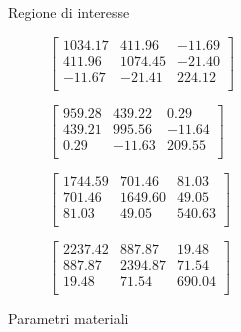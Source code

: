 \documentclass[aspectratio=169,xcolor=dvipsnames]{beamer}
\begin{document}
\begin{frame}{Regione di interesse}
\begin{figure}
\end{figure}
\begin{figure}
				\centering
		\begin{minipage}[b]{0.22\linewidth}
			\tiny{$
				\begin{bmatrix}
					1034.17 & 411.96 & -11.69 \\
					411.96 & 1074.45 & -21.40 \\
					-11.67 & -21.41 & 224.12 \\
				\end{bmatrix}
				$}
		\end{minipage}\hspace{0.01\linewidth}
		\begin{minipage}[b]{0.22\linewidth}
			\centering
			\tiny{$
				\begin{bmatrix}
					959.28 & 439.22 & 0.29 \\
					439.21 & 995.56 & -11.64 \\
					0.29 & -11.63 & 209.55 \\
				\end{bmatrix}
				$}
		\end{minipage}\hspace{0.01\linewidth}
		\begin{minipage}[b]{0.22\linewidth}
			\centering
			\tiny{$
				\begin{bmatrix}
					1744.59 & 701.46 & 81.03 \\
					701.46 & 1649.60 & 49.05 \\
					81.03 & 49.05 & 540.63 \\
				\end{bmatrix}
				$}
		\end{minipage}\hspace{0.01\linewidth}
		\begin{minipage}[b]{0.22\linewidth}
			\centering
			\tiny{$
				\begin{bmatrix}
					2237.42 & 887.87 & 19.48 \\
					887.87 & 2394.87 & 71.54 \\
					19.48 & 71.54 & 690.04 \\
				\end{bmatrix}
				$}
		\end{minipage}		

\end{figure}

\end{frame}

\begin{frame}{Parametri materiali}
\begin{figure}
	\centering
	\begin{minipage}{0.45\linewidth}
	\tiny{\def\svgwidth{0.9\linewidth}
	}
	\end{minipage}\hfill
	\begin{minipage}{0.51\linewidth}
	\tiny{\def\svgwidth{\linewidth}
}
\end{minipage}\hfill
\end{figure}
\end{frame}
\end{document}
